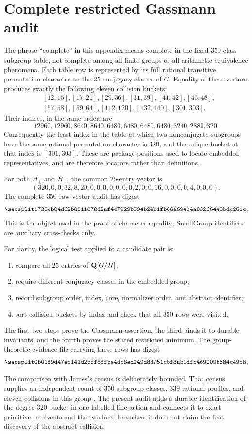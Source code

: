 \section{Complete restricted Gassmann audit}
\label{app:gassmann-audit}

The phrase ``complete'' in this appendix means complete in the fixed
$350$-class subgroup table, not complete among all finite groups or all
arithmetic-equivalence phenomena.  Each table row is represented by its
full rational transitive permutation character on the $25$ conjugacy
classes of $G$.  Equality of these vectors produces exactly the following
eleven collision buckets:
\[
\begin{aligned}
 &[12,15], [17,21], [29,36], [31,39], [41,42], [46,48],\\
 &[57,58], [59,64], [112,120], [132,140], [301,303].
\end{aligned}
\]
Their indices, in the same order, are
\[
 12960,12960,8640,8640,6480,6480,6480,6480,3240,2880,320.
\]
Consequently the least index in the table at which two nonconjugate
subgroups have the same rational permutation character is $320$, and the
unique bucket at that index is $[301,303]$.  These are package positions
used to locate embedded representatives, and are therefore locators rather
than definitions.

For both $H_+$ and $H_-$, the common $25$-entry vector is
\[
 (320,0,0,32,8,20,0,0,0,0,0,0,0,2,0,0,16,0,0,0,0,4,0,0,0).
\]
The complete $350$-row vector audit has digest
\[
 \hexsha{1738cb84d62b8011878d2af4c7929b894b24b1fb66a694c4a03266448bdc261c}.
\]
This is the object used in the proof of character equality; SmallGroup
identifiers are auxiliary cross-checks only.

For clarity, the logical test applied to a candidate pair is:
\begin{enumerate}[label=\textup{B\arabic*.},leftmargin=3em]
\item compare all $25$ entries of $\mathbf{Q}[G/H]$;
\item require different conjugacy classes in the embedded group;
\item record subgroup order, index, core, normalizer order, and abstract
      identifier;
\item sort collision buckets by index and check that all $350$ rows were
      visited.
\end{enumerate}
The first two steps prove the Gassmann assertion, the third binds it to
durable invariants, and the fourth proves the stated restricted minimum.
The group-theoretic evidence file carrying these rows has digest
\[
 \hexsha{0b01f9d47e5141d2bff88fbe4d58ed049d88751cbf8ab1df5469009b684c4958}.
\]

The comparison with James's census is deliberately bounded.  That census
supplies an independent count of $350$ subgroup classes, $339$ rational
profiles, and eleven collisions in this group
\citep[\S3.1, p.~22]{james2022bayesian}.  The present audit adds a durable
identification of the degree-$320$ bucket in one labelled line action and
connects it to exact primitive resolvents and the two local branches; it
does not claim the first discovery of the abstract collision.
